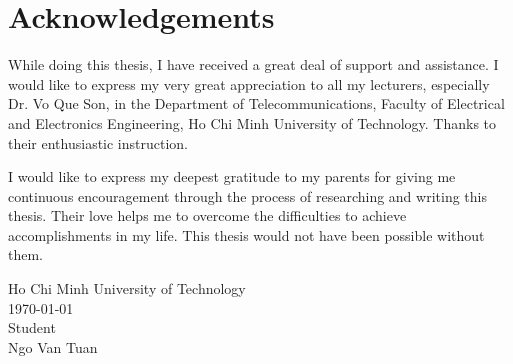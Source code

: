 \documentclass[\main/thesis.tex]{subfiles}
\begin{document}
\graphicspath{{imgs/}{00_misc/imgs/}}

\chapter*{Acknowledgements}
While doing this thesis, I have received a great deal of support and assistance. I would like to express my very great appreciation to all my lecturers, especially Dr. Vo Que Son, in the Department of Telecommunications, Faculty of Electrical and Electronics Engineering, Ho Chi Minh University of Technology. Thanks to their enthusiastic instruction.

I would like to express my deepest gratitude to my parents for giving me continuous encouragement through the process of researching and writing this thesis. Their love helps me to overcome the difficulties to achieve accomplishments in my life. This thesis would not have been possible without them.

\begin{flushright}
\parbox[t][4cm]{8cm}
{   \centering
    Ho Chi Minh University of Technology\\
    \today\\
    Student\\
    \vspace{2cm}
    Ngo Van Tuan
}
\end{flushright}
\end{document}
